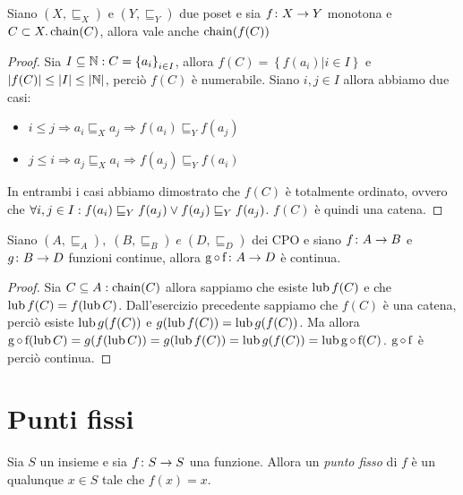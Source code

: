 \begin{proposizione} 
Siano $(X, \sqsubseteq_X)$ e $(Y, \sqsubseteq_Y)$ due poset e sia $\mathord{f}\colon X\to Y$ monotona e $C \subset X . \mathop{\mathrm{chain}}\nolimits(C)$, allora vale anche $\mathop{\mathrm{chain}}\nolimits(f(C))$
\end{proposizione}
\begin{proof}
Sia $I \subseteq \mathbb{N} \mathrel{:} C = \left\{a_i\right\}_{i \in I}$, allora $f(C) = \left\{f(a_i) | i \in I\right\}$ e
$|f(C)| \leq |I| \leq |\mathbb{N}|$, perciò $f(C)$ è numerabile. Siano $i,j \in I$ allora abbiamo due casi:
\begin{itemize}
        \setlength{\itemindent}{20mm}
        \item $i \leq j \Rightarrow a_i \sqsubseteq_X a_j \Rightarrow f(a_i) \sqsubseteq_Y f(a_j)$
        \item $j \leq i \Rightarrow a_j \sqsubseteq_X a_i \Rightarrow f(a_j) \sqsubseteq_Y f(a_i)$
\end{itemize}
In entrambi i casi abbiamo dimostrato che $f(C)$ è totalmente ordinato, ovvero che $\forall i,j \in I \mathrel{:} f(a_i) \sqsubseteq_Y f(a_j) \lor f(a_j) \sqsubseteq_Y f(a_j)$. $f(C)$ è quindi una catena.
\end{proof}

\begin{proposizione} 
Siano $(A, \sqsubseteq_A), \; (B, \sqsubseteq_B) \; e \; (D, \sqsubseteq_D) $ dei CPO e siano $\mathord{f}\colon A\to B$ e $\mathord{g}\colon B\to D$ funzioni continue, allora $\mathord{\mathrm{g}\mathop{\circ}\mathrm{f}}\colon A\to D$ è continua.
\end{proposizione}
\begin{proof}
Sia $C \subseteq A \mathrel{:} \mathop{\mathrm{chain}}\nolimits(C)$ allora sappiamo che esiste $\mathop{\mathrm{lub}}\nolimits f(C)$ e che $\mathop{\mathrm{lub}}\nolimits f(C) = f(\mathop{\mathrm{lub}}\nolimits C)$.
Dall'esercizio precedente sappiamo che $f(C)$ è una catena, perciò esiste $\mathop{\mathrm{lub}}\nolimits g(f(C))$ e $g(\mathop{\mathrm{lub}}\nolimits f(C)) = \mathop{\mathrm{lub}}\nolimits g(f(C))$.
Ma allora $\mathrm{g}\mathop{\circ}\mathrm{f}(\mathop{\mathrm{lub}}\nolimits C) = g(f(\mathop{\mathrm{lub}}\nolimits C)) = g(\mathop{\mathrm{lub}}\nolimits f(C)) = \mathop{\mathrm{lub}}\nolimits g(f(C)) = \mathop{\mathrm{lub}}\nolimits \mathrm{g}\mathop{\circ}\mathrm{f}(C)$.
$\mathrm{g}\mathop{\circ}\mathrm{f}$ è perciò continua.
\end{proof}

\section{Punti fissi}

\begin{definizione} 
Sia $S$ un insieme e sia $\mathord{f}\colon S\to S$ una funzione.
Allora un \emph{punto fisso} di $f$ è un qualunque $x \in S$ tale
che $f(x) = x$.
\end{definizione}

